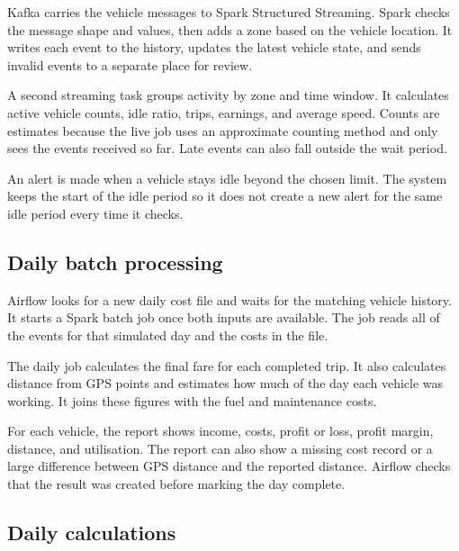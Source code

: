 \documentclass[11pt,a4paper]{article}
\begin{document}
Kafka carries the vehicle messages to Spark Structured Streaming. Spark checks the message shape
and values, then adds a zone based on the vehicle location. It writes each event to the history,
updates the latest vehicle state, and sends invalid events to a separate place for review.

A second streaming task groups activity by zone and time window. It calculates active vehicle
counts, idle ratio, trips, earnings, and average speed. Counts are estimates because the live job
uses an approximate counting method and only sees the events received so far. Late events can also
fall outside the wait period.

An alert is made when a vehicle stays idle beyond the chosen limit. The system keeps the start of
the idle period so it does not create a new alert for the same idle period every time it checks.

\subsection{Daily batch processing}

Airflow looks for a new daily cost file and waits for the matching vehicle history. It starts a
Spark batch job once both inputs are available. The job reads all of the events for that simulated
day and the costs in the file.

The daily job calculates the final fare for each completed trip. It also calculates distance from
GPS points and estimates how much of the day each vehicle was working. It joins these figures with
the fuel and maintenance costs.

For each vehicle, the report shows income, costs, profit or loss, profit margin, distance, and
utilisation. The report can also show a missing cost record or a large difference between GPS
distance and the reported distance. Airflow checks that the result was created before marking the
day complete.

\subsection{Daily calculations}
\end{document}

